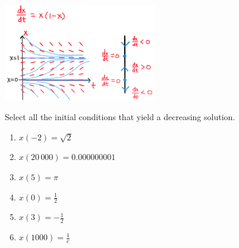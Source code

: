 \begin{center}
	\includegraphics*[width=190pt]{images/module14-preclass.png}
\end{center}
Select all the initial conditions that yield a decreasing solution.
\begin{enumerate}[label=\color{gray}(\alph*)]
	\item $x(-2)=\sqrt{2}$
	\item $x(20\,000)=0.000000001$
	\item $x(5)=\pi$
	\item $x(0)=\frac12$
	\item $x(3)=-\frac12$
	\item $x(1000) = \frac1e$
\end{enumerate}




\bookonlynewpage



